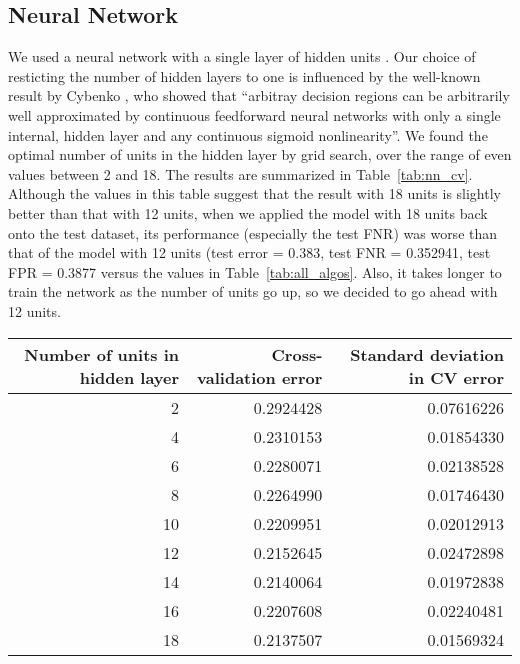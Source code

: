 \subsection{Neural Network}
\label{subsec:nnet}
We used a neural network with a single layer of hidden units \cite{nnet}. Our choice of resticting the number of hidden layers to one is influenced by the well-known result by Cybenko \cite{Cybenko92}, who showed that ``arbitray decision regions can be arbitrarily well approximated by continuous feedforward neural networks with only a single internal, hidden layer and any continuous sigmoid nonlinearity''. We found the optimal number of units in the hidden layer by grid search, over the range of even values between 2 and 18. The results are summarized in Table~\ref{tab:nn_cv}. Although the values in this table suggest that the result with 18 units is slightly better than that with 12 units, when we applied the model with 18 units back onto the test dataset, its performance (especially the test FNR) was worse than that of the model with 12 units (test error = 0.383, test FNR = 0.352941, test FPR = 0.3877 versus the values in Table~\ref{tab:all_algos}. Also, it takes longer to train the network as the number of units go up, so we decided to go ahead with 12 units.

\begin{table*}[!h]
\centering
\caption{Results of grid search for neural network}
\begin{tabular}{rrr}
\hline
Number of units in hidden layer & Cross-validation error & Standard deviation in CV error\\
\hline
2 & 0.2924428 & 0.07616226\\
4 & 0.2310153 & 0.01854330\\
6 & 0.2280071 & 0.02138528\\
8 & 0.2264990 & 0.01746430\\
10 & 0.2209951 & 0.02012913\\
12 & 0.2152645 & 0.02472898\\
14 & 0.2140064 & 0.01972838\\
16 & 0.2207608 & 0.02240481\\
18 & 0.2137507 & 0.01569324\\
\hline
\end{tabular}
\label{tab:nn_cv}
\end{table*}

